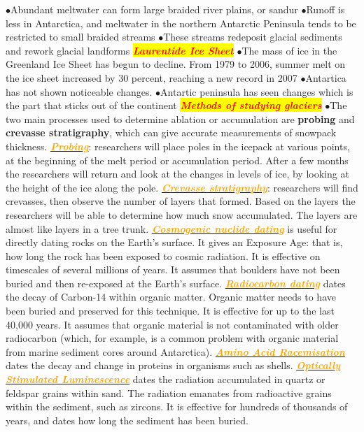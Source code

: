 \documentclass{article}
\newcommand{\ddd}{$\bullet$}
\newcommand{\red}[1]{\textcolor{red}{#1}}
\newcommand{\orange}[1]{\textcolor{orange}{#1}}
\newcommand{\mysection}[1]{\colorbox{yellow}{{\textbf{\textbf{\textit{\red{#1}}}}}}}
\newcommand{\mysub}[1]{\underline{\textbf{{\textit{\orange{#1}}}}}}
\begin{document}
\begin{multicols*}{4}
                \ddd Abundant meltwater can form large braided river plains, or sandur
                \ddd Runoff is less in Antarctica, and meltwater in the northern Antarctic Peninsula tends to be restricted to small braided streams
                \ddd These streams redeposit glacial sediments and rework glacial landforms
        \mysection{Laurentide Ice Sheet}
            \ddd The mass of ice in the Greenland Ice Sheet has begun to decline. From 1979 to 2006, summer melt on the ice sheet increased by 30 percent, reaching a new record in 2007
            \ddd Antartica has not shown noticeable changes. 
            \ddd Antartic peninsula has seen changes which is the part that sticks out of the continent
        \mysection{Methods of studying glaciers}
            \ddd The two main processes used to determine ablation or accumulation are \textbf{probing} and \textbf{crevasse stratigraphy}, which can give accurate measurements of snowpack thickness.
            \mysub{Probing}: researchers will place poles in the icepack at various points, at the beginning of the melt period or accumulation period. After a few months the researchers will return and look at the changes in levels of ice, by looking at the height of the ice along the pole.
            \mysub{Crevasse stratigraphy}: researchers will find crevasses, then observe the number of layers that formed. Based on the layers the researchers will be able to determine how much snow accumulated. The layers are almost like layers in a tree trunk.
            \mysub{Cosmogenic nuclide dating} is useful for directly dating rocks on the Earth’s surface. It gives an Exposure Age: that is, how long the rock has been exposed to cosmic radiation. It is effective on timescales of several millions of years. It assumes that boulders have not been buried and then re-exposed at the Earth’s surface.
            \mysub{Radiocarbon dating} dates the decay of Carbon-14 within organic matter. Organic matter needs to have been buried and preserved for this technique. It is effective for up to the last 40,000 years. It assumes that organic material is not contaminated with older radiocarbon (which, for example, is a common problem with organic material from marine sediment cores around Antarctica).
            \mysub{Amino Acid Racemisation} dates the decay and change in proteins in organisms such as shells.
            \mysub{Optically Stimulated Luminescence} dates the radiation accumulated in quartz or feldspar grains within sand. The radiation emanates from radioactive grains within the sediment, such as zircons. It is effective for hundreds of thousands of years, and dates how long the sediment has been buried.

\end{multicols*}
\end{document}

